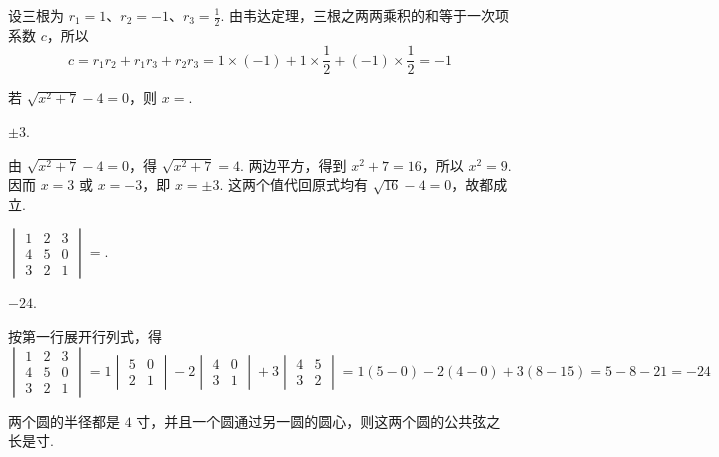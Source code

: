 \documentclass[UTF8,a4paper,oneside,11pt]{ctexbook}
\begin{document}
\begin{solution}
设三根为 \(r_{1}=1\)、\(r_{2}=-1\)、\(r_{3}=\frac12\). 由韦达定理，三根之两两乘积的和等于一次项系数 \(c\)，所以
\[
c=r_{1}r_{2}+r_{1}r_{3}+r_{2}r_{3}=1\times(-1)+1\times\frac12+(-1)\times\frac12=-1
\]
\end{solution}

\begin{problem}
若 \(\sqrt{x^{2}+7}-4=0\)，则 \(x=\)\fillinblank{}.
\end{problem}

\begin{answer}
\(\pm 3\).
\end{answer}

\begin{solution}
由 \(\sqrt{x^{2}+7}-4=0\)，得 \(\sqrt{x^{2}+7}=4\). 两边平方，得到 \(x^{2}+7=16\)，所以 \(x^{2}=9\). 因而 \(x=3\) 或 \(x=-3\)，即 \(x=\pm3\). 这两个值代回原式均有 \(\sqrt{16}-4=0\)，故都成立.
\end{solution}

\begin{problem}
\(\begin{vmatrix}1 & 2 & 3 \\ 4 & 5 & 0 \\ 3 & 2 & 1\end{vmatrix}=\)\fillinblank{}.
\end{problem}

\begin{answer}
\(-24\).
\end{answer}

\begin{solution}
按第一行展开行列式，得
\[
\begin{vmatrix}1&2&3\\4&5&0\\3&2&1\end{vmatrix}=1\begin{vmatrix}5&0\\2&1\end{vmatrix}-2\begin{vmatrix}4&0\\3&1\end{vmatrix}+3\begin{vmatrix}4&5\\3&2\end{vmatrix}=1(5-0)-2(4-0)+3(8-15)=5-8-21=-24
\]
\end{solution}

\begin{problem}
两个圆的半径都是 \(4\text{ 寸}\)，并且一个圆通过另一圆的圆心，则这两个圆的公共弦之长是\fillinblank{}\(\text{寸}\).
\end{problem}
\end{document}
